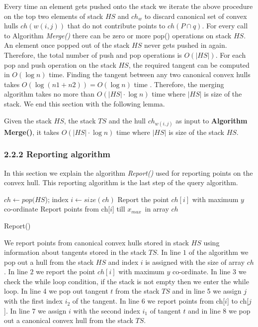 \documentclass[runningheads,a4paper]{llncs}
\begin{document}
Every time an element gets pushed onto the stack we iterate the above
procedure on the top two elements of stack $HS$ and $ch_{w}$ to discard canonical set of
convex hulls $ch(w(i,j))$ that do not contribute points to $ch(P \cap q)$.
For every call to Algorithm \emph{Merge()} there
can be zero or more pop() operations on stack $HS$. An element once popped out
of the stack $HS$ never gets pushed in again. Therefore, the total number of
push and pop operations is $O(|HS|)$. For each pop and push operation on
the stack $HS$, the required tangent can be computed in $O(\log n)$ time.
Finding the tangent between any two canonical convex hulls takes $O(\log(n1+n2)) = O(\log n)$
time \cite{kirkpatrick}.  Therefore, the merging algorithm takes no more than
$O(|HS|\cdot \log n)$ time where $|HS|$ is size of the stack. We end this section with the following lemma.

\begin{lemma}\label{lem2}
Given the stack $HS$, the stack $TS$ and the hull $ch_{w(i,j)}$ as input to {\bf Algorithm Merge()}, it takes 
$O(|HS|\cdot \log n)$ time where $|HS|$ is size of the stack $HS$.
\end{lemma}

\subsubsection{2.2.2  Reporting algorithm}\label{putting}
In this section we explain the algorithm \emph{Report()} used for reporting
points on the convex hull.  This reporting algorithm is the last step of the
query algorithm.
\begin{algorithm}\label{reporting}
$ch \leftarrow pop(HS$);
index $i \leftarrow size(ch)$\;
Report the point $ch[i]$ with maximum $y$ co-ordinate\;
Report points from  ch[$i$] till $x_{max}$\ in array $ch$\;
\caption{Report()}
\end{algorithm}
\vspace{-0.7cm}
We report points from canonical convex hulls stored in
stack $HS$ using information about tangents stored in the stack $TS$.
In line $1$ of the algorithm we pop out a hull from the stack $HS$ and index $i$
is assigned with the size of array $ch$. In line $2$ we report the point $ch[i]$ with maximum $y$ co-ordinate.
In line $3$ we check the while loop condition, if the stack is not empty then we enter the while loop.  In line 4
we pop out tangent $t$ from the stack $TS$ and in line 5 we assign $j$ with
the first index $i_{2}$ of the tangent.  In line 6 we report points from
ch[$i$] to ch[$j$].  In line 7 we assign $i$ with the second index $i_{1}$ of
tangent $t$ and in line 8 we pop out a canonical convex hull from the stack $TS$.
\end{document}
